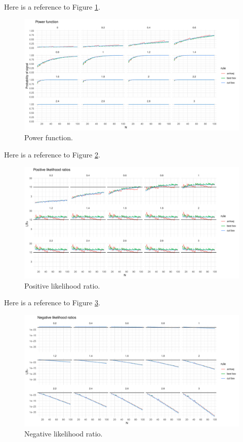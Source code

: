 Here is a reference to Figure \ref{figure:pwr}.

\begin{figure}[htbp]
  \centering
  \includegraphics[width=\textwidth]{fig_pwr.pdf}
  \caption{Power function.}
  \label{figure:pwr}
\end{figure}

Here is a reference to Figure \ref{figure:lrpos}.

\begin{figure}[htbp]
  \centering
  \includegraphics[width=\textwidth]{fig_lrpos.pdf}
  \caption{Positive likelihood ratio.}
  \label{figure:lrpos}
\end{figure}

Here is a reference to Figure \ref{figure:lrneg}.

\begin{figure}[htbp]
  \centering
  \includegraphics[width=\textwidth]{fig_lrneg.pdf}
  \caption{Negative likelihood ratio.}
  \label{figure:lrneg}
\end{figure}

